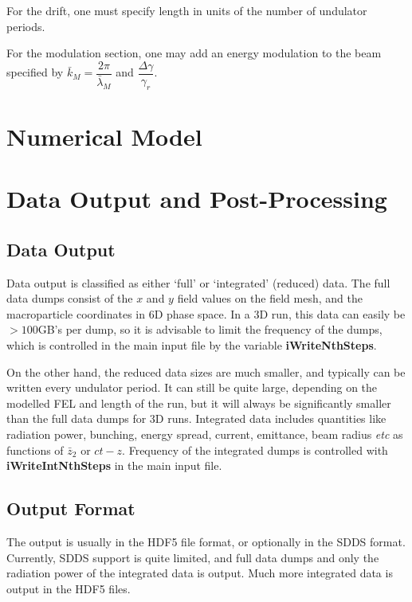 \documentclass[12pt]{article}%
\begin{document}
For the drift, one must specify length in units of the number of undulator periods.

For the modulation section, one may add an energy modulation to the beam specified by $\bar{k}_M = \dfrac{2 \pi}{\bar{\lambda}_M}$ and $\dfrac{\Delta \gamma}{\gamma_r}$.


\newpage

\section{Numerical Model}

\newpage

\section{Data Output and Post-Processing}

\subsection{Data Output}

Data output is classified as either `full' or `integrated' (reduced) data. The full data dumps consist of the $x$ and $y$ field values on the field mesh, and the macroparticle coordinates in 6D phase space. In a 3D run, this data can easily be $>100$GB's per dump, so it is advisable to limit the frequency of the dumps, which is controlled in the main input file by the variable {\bf iWriteNthSteps}.

On the other hand, the reduced data sizes are much smaller, and typically can be written every undulator period. It can still be quite large, depending on the modelled FEL and length of the run, but it will always be significantly smaller than the full data dumps for 3D runs. Integrated data includes quantities like radiation power, bunching, energy spread, current, emittance, beam radius \textit{etc} as functions of $\bar{z}_2$ or $ct-z$. Frequency of the integrated dumps is controlled with {\bf iWriteIntNthSteps} in the main input file.

\subsection{Output Format}

The output is usually in the HDF5 file format, or optionally in the SDDS format. Currently, SDDS support is quite limited, and full data dumps and only the radiation power of the integrated data is output. Much more integrated data is output in the HDF5 files.
\end{document}

